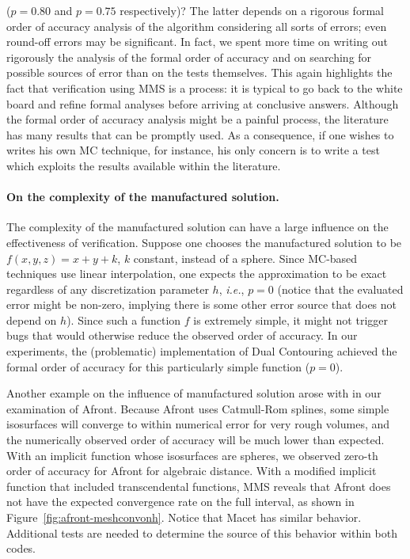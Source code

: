 ($p = 0.80$ and $p = 0.75$ respectively)?
%
The latter depends on a rigorous formal order of accuracy analysis of the algorithm
considering all sorts of errors; even round-off errors may be
significant. In fact, we spent more time on writing out rigorously the
analysis of the formal order of accuracy and on searching for possible sources of
error than on the tests themselves. This again highlights the fact that verification 
using MMS is a process: it is typical to go back to the white board and refine
formal analyses before arriving at conclusive answers.
%
Although the formal order of accuracy analysis might be a painful
process, the literature has many results that can be promptly
used. As a consequence, if one wishes to writes his own MC technique,
for instance, his only concern is to write a test which exploits 
the results available within the literature.

\paragraph*{On the complexity of the manufactured solution.}
\label{chap1:sec:mms-complexity}
The complexity of the manufactured solution can have a large influence
on the effectiveness of verification. 
Suppose one chooses the manufactured solution to be $f(x,y,z) = x + y + k
$, $k$ constant, instead of a
sphere. Since MC-based techniques use linear interpolation,
one expects the approximation
to be exact regardless of any discretization
parameter $h$, {\em i.e.}, $p = 0$ (notice that the evaluated error might
be non-zero, implying there is some other error source that
does not depend on $h$).
%
Since such a function $f$ is extremely simple,
it might not trigger bugs that would otherwise reduce the
observed order of accuracy. In our experiments, the (problematic) implementation of
Dual Contouring achieved the formal order of accuracy for this
particularly simple function ($p = 0$).

Another example on the influence of manufactured solution arose with
in our examination of Afront. Because Afront uses Catmull-Rom splines, some simple
isosurfaces will converge to within numerical error for very rough
volumes, and the numerically observed order of accuracy will be much
lower than expected. With an implicit function whose isosurfaces are
spheres, we observed zero-th order of accuracy for Afront for algebraic distance. 
With a modified implicit function that included transcendental functions, 
MMS reveals that Afront does not have the expected convergence rate on the 
full interval, as shown in
Figure~\ref{fig:afront-meshconvonh}. Notice that Macet has similar behavior.
Additional tests are needed to determine the source 
of this behavior within both codes.

